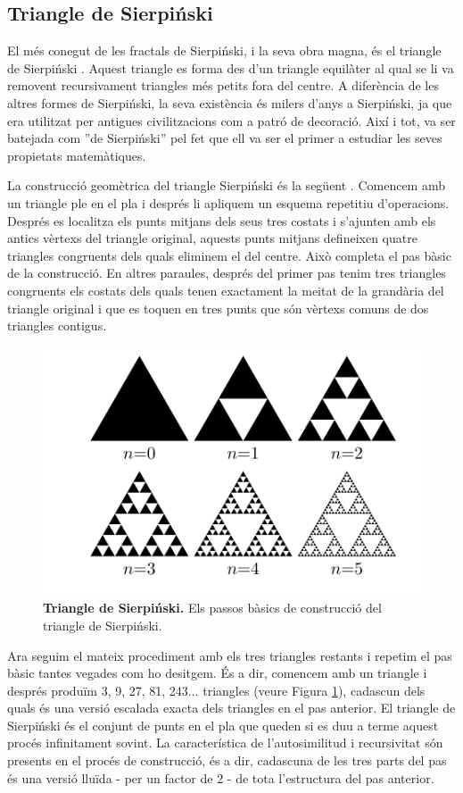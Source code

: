 \documentclass[12pt,a4paper]{report}
\begin{document}
\subsection{Triangle de Sierpiński}
El més conegut de les fractals de Sierpiński, i la seva obra magna, és el triangle de Sierpiński \cite{ChaosFractal}. Aquest triangle es forma des d'un triangle equilàter al qual se li va removent recursivament triangles més petits fora del centre. A diferència de les altres formes de Sierpiński, la seva existència és milers d'anys a Sierpiński, ja que era utilitzat per antigues civilitzacions com a patró de decoració. Així i tot, va ser batejada com ''de Sierpiński'' pel fet que ell va ser el primer a estudiar les seves propietats matemàtiques.

La construcció geomètrica del triangle Sierpiński és la següent \cite[p.~76]{ChaosFractal}. Comencem amb un triangle ple en el pla i després li apliquem un esquema repetitiu d'operacions. Després es localitza els punts mitjans dels seus tres costats i s'ajunten amb els antics vèrtexs del triangle original, aquests punts mitjans defineixen quatre triangles congruents dels quals eliminem el del centre. Això completa el pas bàsic de la construcció. En altres paraules, després del primer pas tenim tres triangles congruents els costats dels quals tenen exactament la meitat de la grandària del triangle original i que es toquen en tres punts que són vèrtexs comuns de dos triangles contigus.
\begin{figure}[!ht]
\centering
\includegraphics[scale=1]{img/img03_09_sierpinski.pdf} 
\caption{\textbf{Triangle de Sierpiński.} Els passos bàsics de construcció del triangle de Sierpiński.}
\label{img03_09}
\end{figure}

Ara seguim el mateix procediment amb els tres triangles restants i repetim el pas bàsic tantes vegades com ho desitgem. És a dir, comencem amb un triangle i després produïm 3, 9, 27, 81, 243$\ldots$ triangles (veure Figura \ref{img03_09}), cadascun dels quals és una versió escalada exacta dels triangles en el pas anterior.  El triangle de Sierpiński és el conjunt de punts en el pla que queden si es duu a terme aquest procés infinitament sovint.  La característica de l'autosimilitud i recursivitat són presents  en el procés de construcció, és a dir, cadascuna de les tres parts del pas és una versió lluïda - per un factor de 2 - de tota l'estructura del pas anterior.
\end{document}
